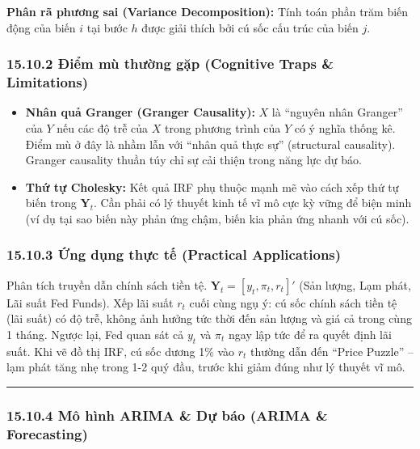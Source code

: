 \documentclass[
]{article}
\providecommand{\tightlist}{%
  \setlength{\itemsep}{0pt}\setlength{\parskip}{0pt}}
\begin{document}
\textbf{Phân rã phương sai (Variance Decomposition):} Tính toán phần
trăm biến động của biến \(i\) tại bước \(h\) được giải thích bởi cú sốc
cấu trúc của biến \(j\).

\subsubsection{15.10.2 Điểm mù thường gặp (Cognitive Traps \&
Limitations)}\label{ux111iux1ec3m-muxf9-thux1b0ux1eddng-gux1eb7p-cognitive-traps-limitations-108}

\begin{itemize}
\tightlist
\item
  \textbf{Nhân quả Granger (Granger Causality):} \(X\) là ``nguyên nhân
  Granger'' của \(Y\) nếu các độ trễ của \(X\) trong phương trình của
  \(Y\) có ý nghĩa thống kê. Điểm mù ở đây là nhầm lẫn với ``nhân quả
  thực sự'' (structural causality). Granger causality thuần túy chỉ sự
  cải thiện trong năng lực dự báo.
\item
  \textbf{Thứ tự Cholesky:} Kết quả IRF phụ thuộc mạnh mẽ vào cách xếp
  thứ tự biến trong \(\mathbf{Y}_t\). Cần phải có lý thuyết kinh tế vĩ
  mô cực kỳ vững để biện minh (ví dụ tại sao biến này phản ứng chậm,
  biến kia phản ứng nhanh với cú sốc).
\end{itemize}

\subsubsection{15.10.3 Ứng dụng thực tế (Practical
Applications)}\label{ux1ee9ng-dux1ee5ng-thux1ef1c-tux1ebf-practical-applications-64}

Phân tích truyền dẫn chính sách tiền tệ.
\(\mathbf{Y}_t = [y_t, \pi_t, r_t]'\) (Sản lượng, Lạm phát, Lãi suất Fed
Funds). Xếp lãi suất \(r_t\) cuối cùng ngụ ý: cú sốc chính sách tiền tệ
(lãi suất) có độ trễ, không ảnh hưởng tức thời đến sản lượng và giá cả
trong cùng 1 tháng. Ngược lại, Fed quan sát cả \(y_t\) và \(\pi_t\) ngay
lập tức để ra quyết định lãi suất. Khi vẽ đồ thị IRF, cú sốc dương 1\%
vào \(r_t\) thường dẫn đến ``Price Puzzle'' -- lạm phát tăng nhẹ trong
1-2 quý đầu, trước khi giảm đúng như lý thuyết vĩ mô.

\begin{center}\rule{0.5\linewidth}{0.5pt}\end{center}

\subsubsection{15.10.4 Mô hình ARIMA \& Dự báo (ARIMA \&
Forecasting)}\label{muxf4-huxecnh-arima-dux1ef1-buxe1o-arima-forecasting}
\end{document}
